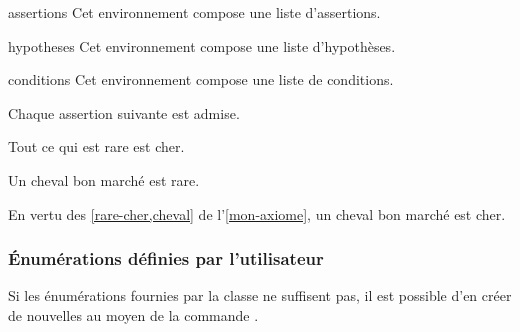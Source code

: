 \documentclass[french,nolocaltoc]{nwejmart}
\newtheorem[style=definition]{fait}
\newtheorem[title=contraventionnalisation]{ctrv}
\newtheorem[title-plural=anneaux]{anneau}
\newtheorem[title-plural=idéaux]{idéal}
\begin{document}
\begin{docEnvironment}[doclang/environment content=assertions]{assertions}{}
  Cet environnement compose une liste d'assertions.
\end{docEnvironment}
\begin{docEnvironment}[doclang/environment content=hypothèses]{hypotheses}{}
  Cet environnement compose une liste d'hypothèses.
\end{docEnvironment}
\begin{docEnvironment}[doc new=2019-03-18,doclang/environment content=conditions]{conditions}{}
  Cet environnement compose une liste de conditions.
\end{docEnvironment}

\begin{bodycode}[listing and text,listing options={deletekeywords={[2]label}}]
\begin{axiom}\label{mon-axiome}
  Chaque assertion suivante est admise.
  \begin{assertions}
  \item\label{rare-cher} Tout ce qui est rare est cher.
  \item\label{cheval} Un cheval bon marché est rare.
  \end{assertions}
\end{axiom}
En vertu des \vref{rare-cher,cheval} de l'\vref{mon-axiome},
un cheval bon marché est cher.
\end{bodycode}

\subsubsection{Énumérations définies par l'utilisateur}

Si les énumérations fournies par la classe ne suffisent pas, il est possible
d'en créer de nouvelles au moyen de la commande .
\end{document}
